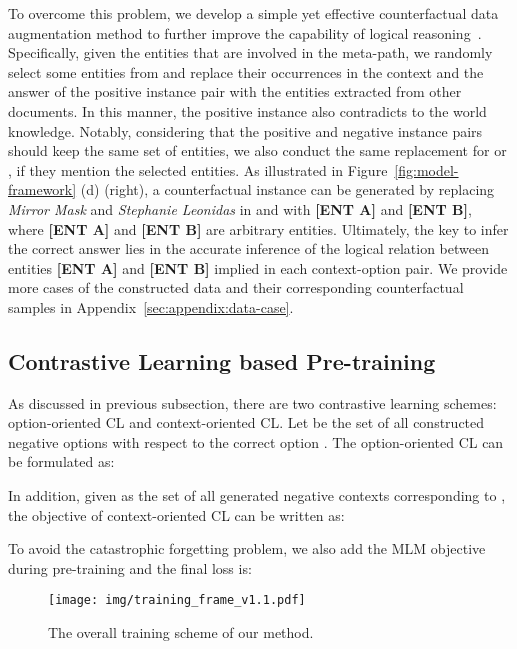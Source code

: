 To overcome this problem, we develop a simple yet effective counterfactual data augmentation method to further improve the capability of logical reasoning~\citep{counterfactual-ner}. 
Specifically, given the entities  that are involved in the meta-path, we randomly select some entities from  and replace their occurrences in the context and the answer of the positive instance pair  with the entities extracted from other documents. In this manner, the positive instance also contradicts to the world knowledge.
Notably, considering that the positive and negative instance pairs should keep the same set of entities, we also conduct the same replacement for  or , if they mention the selected entities.
As illustrated in Figure~\ref{fig:model-framework} (d) (right), a counterfactual instance can be generated by replacing \textit{Mirror Mask} and \textit{Stephanie Leonidas} in  and  with \textbf{[ENT A]} and \textbf{[ENT B]}, where \textbf{[ENT A]} and \textbf{[ENT B]} are arbitrary entities.
Ultimately, the key to infer the correct answer lies in the accurate inference of the logical relation between entities \textbf{[ENT A]} and \textbf{[ENT B]} implied in each context-option pair.
We provide more cases of the constructed data and their corresponding counterfactual samples in Appendix~\ref{sec:appendix:data-case}.



\subsection{Contrastive Learning based Pre-training}
\label{sec:method:cl}

As discussed in previous subsection, there are 
two contrastive learning schemes: option-oriented CL and context-oriented CL. 
Let  be the set of all constructed negative options with respect to the correct option . The option-oriented CL can be formulated as:

In addition, given  as the set of all generated negative contexts corresponding to , the objective of context-oriented CL can be written as:

To avoid the catastrophic forgetting problem, we also add the MLM objective during pre-training and the final loss is:


\begin{figure}
    \centering
    \texttt{[image: img/training\_frame\_v1.1.pdf]}
    \caption{The overall training scheme of our method.}
    \label{fig:training_frame}
    \vspace{-0.5cm}
\end{figure}


